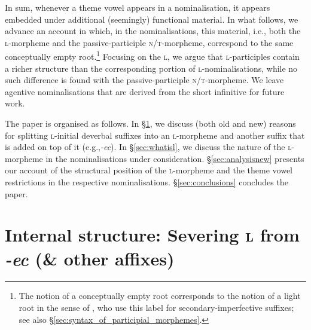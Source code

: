 \documentclass[output=paper,colorlinks,citecolor=brown]{langscibook}
\begin{document}
\noindent In sum, whenever a theme vowel appears in a nominalisation, it appears embedded under additional (seemingly) functional material. In what follows, we advance an account in which, in the nominalisations, this material, i.e., both the \textsc{l}-morpheme and the passive-participle \textsc{n/t}-morpheme, correspond to the same conceptually empty root.\footnote{The notion of a conceptually empty root corresponds to the notion of a light root in the sense of \citet{Quaglia2022}, who use this label for secondary-imperfective suffixes; see also \S \ref{sec:syntax_of_participial_morphemes}.} Focusing on the \textsc{l}, we argue that \textsc{l}-participles contain a richer structure than the corresponding portion of \textsc{l}-nominalisations, while no such difference is found with the passive-participle \textsc{n/t}-morpheme. We leave agentive nominalisations that are derived from the short infinitive for future work.


The paper is organised as follows. In \S \ref{sec:severing}, we discuss (both old and new) reasons for splitting \textsc{l-}initial deverbal suffixes into an \textsc{l}-morpheme and another suffix that is added on top of it (e.g.,\textit{-ec}). In \S \ref{sec:whatisl}, we discuss the nature of the \textsc{l}-morpheme in the nominalisations under consideration. \S \ref{sec:analysisnew} presents our account of the structural position of the \textsc{l}-morpheme and the theme vowel restrictions in the respective nominalisations. \S \ref{sec:conclusions} concludes the paper. 

\section{Internal structure: Severing \textsc{l} from \textit{-ec} (\& other affixes)}\label{sec:severing}
\end{document}
